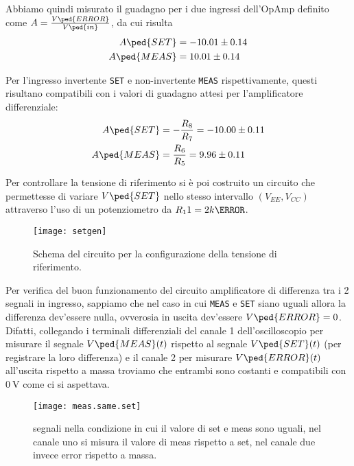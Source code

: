 \documentclass[10pt, a4paper, italian]{article}
\begin{document}
Abbiamo quindi misurato il guadagno per i due ingressi dell'OpAmp definito
come $A = \frac{V\ped{ERROR}}{V\ped{in}}$, da cui risulta
\begin{align*}
A\ped{SET} &= -10.01 \pm 0.14 \\
A\ped{MEAS} &= 10.01 \pm 0.14
\end{align*}

Per l'ingresso invertente \verb+SET+ e non-invertente \verb+MEAS+
rispettivamente, questi risultano compatibili con i valori di guadagno attesi
per l'amplificatore differenziale:
\begin{align*}
A\ped{SET} &= - \frac{R_8}{R_7} = -10.00 \pm 0.11 \\
A\ped{MEAS} &= \frac{R_6}{R_5} = 9.96 \pm 0.11
\end{align*}

Per controllare la tensione di riferimento si è poi costruito un circuito che
permettesse di variare $V\ped{SET}$ nello stesso intervallo
$(V_{EE}, V_{CC})$ attraverso l'uso di un potenziometro da $R_11 = 2 k\ohm$.
\begin{figure}[htbp]
    \centering
	\texttt{[image: setgen]}
    \caption{Schema del circuito per la configurazione della tensione di
    riferimento.
    \label{schm: setgen}}
\end{figure}
Per verifica del buon funzionamento del circuito amplificatore di differenza
tra i 2 segnali in ingresso, sappiamo che nel caso in cui \verb+MEAS+ e
\verb+SET+ siano uguali allora la differenza dev'essere nulla, ovverosia
in uscita dev'essere $V\ped{ERROR} = 0$.
Difatti, collegando i terminali differenziali del canale 1 dell'oscilloscopio
per misurare il segnale $V\ped{MEAS} (t)$ rispetto al segnale $V\ped{SET} (t)$
(per registrare la loro differenza) e il canale 2 per misurare
$V\ped{ERROR} (t)$ all'uscita rispetto a massa troviamo che entrambi sono
costanti e compatibili con $\SI{0}{\V}$ come ci si aspettava.
\begin{figure}[H]
    \centering
	\texttt{[image: meas.same.set]}
    \caption{segnali nella condizione in cui il valore di set e meas sono uguali, nel canale uno si misura il valore di meas rispetto a set, nel canale due invece error rispetto a massa.
    \label{fig: Draft1}}
\end{figure}

\end{document}
